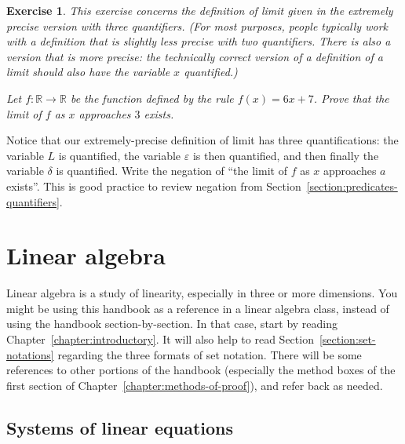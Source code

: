 \documentclass{book}
\newcounter{ekcounter}%
\theoremstyle{ekimcustom}
\newtheorem{exercise}[ekcounter]{Exercise}
\begin{document}
\begin{exercise}
This exercise concerns the definition of limit given in the extremely precise version with three quantifiers. (For most purposes, people typically work with a definition that is slightly less precise with two quantifiers. There is also a version that is more precise: the technically correct version of a definition of a limit should also have the variable $x$ quantified.)

Let $f : \mathbb{R} \to \mathbb{R}$ be the function defined by the rule $f(x)=6x+7$. Prove that the limit of $f$ as $x$ approaches $3$ exists.
\end{exercise}
Notice that our extremely-precise definition of limit has three quantifications: the variable $L$ is quantified, the variable $\varepsilon$ is then quantified, and then finally the variable $\delta$ is quantified. Write the negation of ``the limit of $f$ as $x$ approaches $a$ exists''. This is good practice to review negation from Section~\ref{section:predicates-quantifiers}.



\section{Linear algebra}

Linear algebra is a study of linearity, especially in three or more dimensions. You might be using this handbook as a reference in a linear algebra class, instead of using the handbook section-by-section. In that case, start by reading Chapter~\ref{chapter:introductory}. It will also help to read Section~\ref{section:set-notations} regarding the three formats of set notation. There will be some references to other portions of the handbook (especially the method boxes of the first section of Chapter~\ref{chapter:methods-of-proof}), and refer back as needed.

\subsection{Systems of linear equations}
\end{document}
